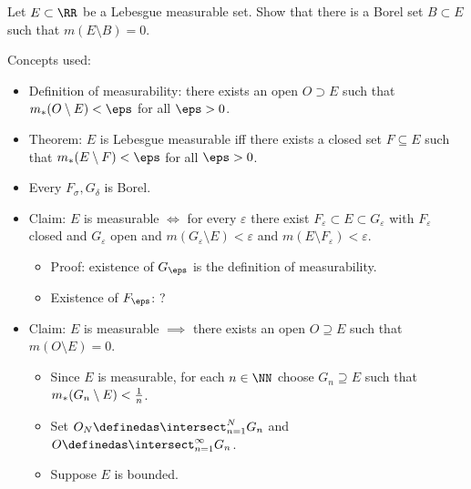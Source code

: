 Let \(E\subset \RR\) be a Lebesgue measurable set. Show that there is a
Borel set \(B \subset E\) such that \(m(E\setminus B) = 0\).


\begin{solution}

Concepts used:

\begin{itemize}
\tightlist
\item
  Definition of measurability: there exists an open \(O\supset E\) such
  that \(m_*(O\setminus E) < \eps\) for all \(\eps> 0\).
\item
  Theorem: \(E\) is Lebesgue measurable iff there exists a closed set
  \(F\subseteq E\) such that \(m_*(E\setminus F) < \eps\) for all
  \(\eps>0\).
\item
  Every \(F_\sigma, G_\delta\) is Borel.
\item
  Claim: \(E\) is measurable \(\iff\) for every \(\varepsilon\) there
  exist \(F_\varepsilon \subset E \subset G_\varepsilon\) with
  \(F_\varepsilon\) closed and \(G_\varepsilon\) open and
  \(m(G_\varepsilon \setminus E)< \varepsilon\) and
  \(m(E\setminus F_\varepsilon) < \varepsilon\).

  \begin{itemize}
  \tightlist
  \item
    Proof: existence of \(G_\eps\) is the definition of measurability.
  \item
    Existence of \(F_\eps\): ?
  \end{itemize}
\item
  Claim: \(E\) is measurable \(\implies\) there exists an open
  \(O\supseteq E\) such that \(m(O\setminus E) = 0\).

  \begin{itemize}
  \tightlist
  \item
    Since \(E\) is measurable, for each \(n\in \NN\) choose
    \(G_n \supseteq E\) such that \(m_*(G_n\setminus E) < {1\over n}\).
  \item
    Set \(O_N \definedas \intersect_{n=1}^N G_n\) and
    \(O\definedas \intersect_{n=1}^\infty G_n\).
  \item
    Suppose \(E\) is bounded.


\end{itemize}
\end{itemize}
\end{solution}
